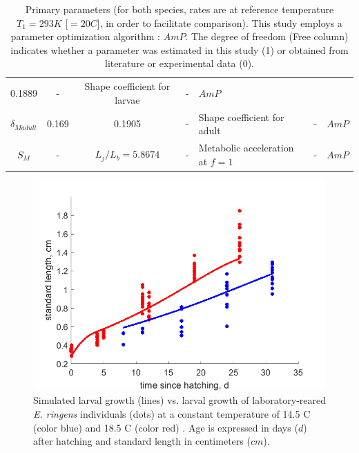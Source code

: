 \begin{table}[ht]
\begin{adjustbox}{width=1.2\textwidth}
\begin{tabular}{c|c|c|c|l|c|c}
0.1889							& 
-								& 
Shape coefficient for larvae	& 
-								&
$AmP$							\\
$\delta_{Madult}$			& 
0.169						& 
0.1905						& 
-							& 
Shape coefficient for adult	& 
-							&
$AmP$						\\
$S_{M}$								& 
-									& 
$L_{j}/L_{b} = 5.8674$				& 
-									& 
Metabolic acceleration at $f = 1$	& 
-									&
$AmP$								\\
\end{tabular}
\end{adjustbox}
\caption{Primary parameters (for both species, rates are at reference temperature $T_{1} = 293 K$  [$=20$\textdegree $C$], in order to facilitate comparison). This study employs a parameter optimization algorithm : $AmP$. The degree of freedom (Free column) indicates whether a parameter was estimated in this study (1) or obtained from literature or experimental data (0).}
\label{param_compar}
\end{table}

\begin{figure}[H]
	\includegraphics[width=1.0\textwidth]{figures/Chap4LarvaDataVSModel.png}
	\centering
	\caption{Simulated larval growth (lines) vs. larval growth of laboratory-reared \textit{E. ringens} individuals (dots) at a constant temperature of 14.5 \textdegree C (color blue) and 18.5 \textdegree C (color red) \citep{RiouOfel2021}. Age is expressed in days ($d$) after hatching and standard length in centimeters ($cm$).}
	\label{Chap4LarvaDataVSModel}
\end{figure}


